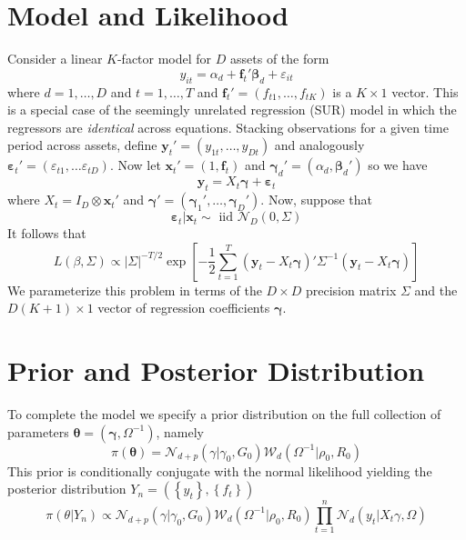 \documentclass[12pt]{article}
\begin{document}
\section{Model and Likelihood}

Consider a linear $K$-factor model for $D$ assets of the form
\begin{equation*}
  y_{it}=\alpha _{d} + \mathbf{f}_{t}' \boldsymbol{\beta}_d + \varepsilon_{it}
\end{equation*}
where $d = 1, \hdots, D$ and $t = 1, \hdots, T$ and $\mathbf{f}_{t}'=\left(f_{t1}, \hdots,f_{tK}\right)$ is a $K\times1$ vector.
This is a special case of the seemingly unrelated regression (SUR) model in which the regressors are \emph{identical} across equations.
Stacking observations for a given time period across assets, define $\mathbf{y}_t' = (y_{1t}, \hdots, y_{Dt})$ and analogously $\boldsymbol{\varepsilon}_t' = \left( \varepsilon_{t1}, \hdots \varepsilon_{tD} \right)$.
Now let $\mathbf{x}_t' = (1, \mathbf{f}_t)$ and $\boldsymbol{\gamma}_d' = (\alpha_d, \boldsymbol{\beta}_d')$ so we have
\begin{equation*}
  \mathbf{y}_t = X_t \boldsymbol{\gamma} + \boldsymbol{\varepsilon}_t
\end{equation*}
where $X_t = I_D \otimes \mathbf{x}_t'$ and $\boldsymbol{\gamma}'= \left( \boldsymbol{\gamma}_1', \hdots, \boldsymbol{\gamma}_D' \right)$. 
Now, suppose that 
\begin{equation*}
  \boldsymbol{\varepsilon}_t|\mathbf{x}_t \sim \mbox{ iid } \mathcal{N}_D(0, \Sigma)
\end{equation*}
It follows that 
\begin{equation*}
  L(\beta,\Sigma) \propto |\Sigma|^{-T/2} \exp\left[ -\frac{1}{2} \sum_{t=1}^T \left(\mathbf{y}_t - X_t \boldsymbol{\gamma} \right)' \Sigma^{-1} \left(\mathbf{y}_t - X_t \boldsymbol{\gamma} \right)\right]
\end{equation*}
We parameterize this problem in terms of the $D\times D$ precision matrix $\Sigma$ and the $D(K+1)\times1$ vector of regression coefficients $\boldsymbol{\gamma}$.

\section{Prior and Posterior Distribution}
To complete the model we specify a prior distribution on the full collection of parameters $\boldsymbol{\theta} = \left( \boldsymbol{\gamma}, \Omega^{-1} \right)$, namely 
\begin{equation*}
  \pi (\boldsymbol{\theta})=\mathcal{N}_{d+p}\left( \gamma |\gamma _{0},G_{0}\right)
\mathcal{W}_{d}\left( \Omega ^{-1}|\rho _{0},R_{0}\right)
\end{equation*}%
This prior is conditionally conjugate with the normal likelihood yielding the posterior distribution
$Y_{n}=\left( \left\{ y_{t}\right\} ,\left\{ f_{t}\right\} \right)$ 
\begin{equation*}
\pi (\theta |Y_{n})\propto \mathcal{N}_{d+p}\left( \gamma |\gamma
_{0},G_{0}\right) \mathcal{W}_{d}\left( \Omega ^{-1}|\rho _{0},R_{0}\right)
\prod\limits_{t=1}^{n}\mathcal{N}_{d}(y_{t}|X_{t}\gamma ,\Omega )
\end{equation*}
\end{document}
